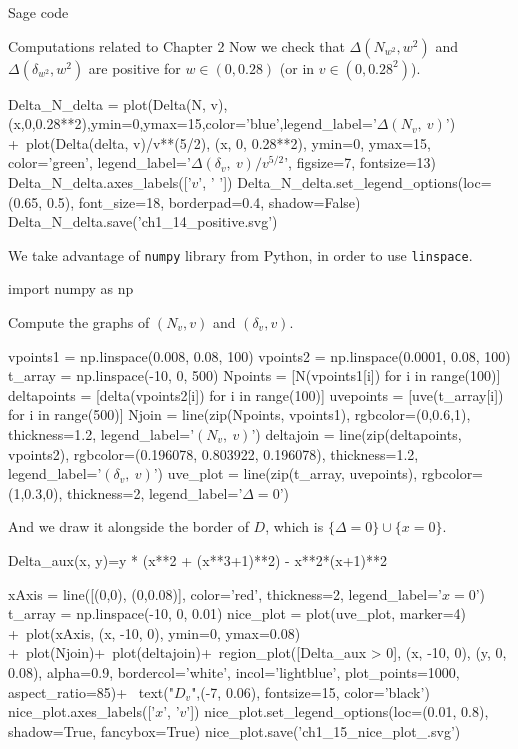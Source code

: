 \documentclass[11pt, a4paper, english, twoside, notitlepage, openright]{report}
\begin{document}
\begin{chapter}{Sage code}
\begin{section}{Computations related to Chapter 2}
Now we check that $\Delta(N_{w^2}, w^2)$ and $\Delta(\delta_{w^2}, w^2)$ are positive for $w \in (0, 0.28)$ (or in $v \in (0, 0.28^2)$).
\begin{sage}
Delta_N_delta = plot(Delta(N, v),(x,0,0.28**2),ymin=0,ymax=15,color='blue',legend_label='$\Delta(N_{v},\ v)$') +\
    plot(Delta(delta, v)/v**(5/2), (x, 0, 0.28**2), ymin=0, ymax=15, color='green', legend_label='$\Delta(\delta_{v},\ v)/v^{5/2}$', figsize=7, fontsize=13)
Delta_N_delta.axes_labels(['$v$', ' '])
Delta_N_delta.set_legend_options(loc=(0.65, 0.5), font_size=18, borderpad=0.4, shadow=False)
Delta_N_delta.save('ch1_14_positive.svg')
\end{sage}

We take advantage of {\tt numpy} library from Python, in order to use {\tt linspace}.
\begin{sage}
import numpy as np
\end{sage}

Compute the graphs of $(N_v, v)$ and $(\delta_v, v)$.
\begin{sage}
vpoints1 = np.linspace(0.008, 0.08, 100)
vpoints2 = np.linspace(0.0001, 0.08, 100)
t_array = np.linspace(-10, 0, 500)
Npoints = [N(vpoints1[i]) for i in range(100)]
deltapoints = [delta(vpoints2[i]) for i in range(100)]
uvepoints = [uve(t_array[i]) for i in range(500)]
Njoin = line(zip(Npoints, vpoints1), rgbcolor=(0,0.6,1), thickness=1.2, legend_label='$(N_v,\ v)$')
deltajoin = line(zip(deltapoints, vpoints2), rgbcolor=(0.196078, 0.803922, 0.196078), thickness=1.2, legend_label='$(\delta_v,\ v)$')
uve_plot = line(zip(t_array, uvepoints), rgbcolor=(1,0.3,0), thickness=2, legend_label='$\Delta = 0$')
\end{sage}

And we draw it alongside the border of $D$, which is $\{\Delta = 0\} \cup \{x=0\}$.
\begin{sage}
Delta_aux(x, y)=y * (x**2 + (x**3+1)**2) - x**2*(x+1)**2
\end{sage}

\begin{sage}
xAxis = line([(0,0), (0,0.08)], color='red', thickness=2, legend_label='$x = 0$')
t_array = np.linspace(-10, 0, 0.01)
nice_plot = plot(uve_plot, marker=4) +\
    plot(xAxis, (x, -10, 0), ymin=0, ymax=0.08) +\
    plot(Njoin)+\
    plot(deltajoin)+\
    region_plot([Delta_aux > 0], (x, -10, 0), (y, 0, 0.08), alpha=0.9, bordercol='white', incol='lightblue', plot_points=1000, aspect_ratio=85)+ \
    text("$D_v$",(-7, 0.06), fontsize=15, color='black')
nice_plot.axes_labels(['$x$', '$v$'])
nice_plot.set_legend_options(loc=(0.01, 0.8), shadow=True, fancybox=True)
nice_plot.save('ch1_15_nice_plot_.svg')
\end{sage}


\end{section}
\end{chapter}
\end{document}
